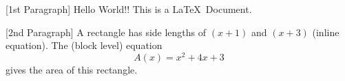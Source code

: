 \documentclass[12pt]{article} %
\begin{document}
[1st Paragraph] Hello World!! This is a \LaTeX\ Document.

\medskip

[2nd Paragraph] A rectangle has side lengths of $(x+1)$ and $(x+3)$ (inline equation).
The (block level) equation $${A(x) = x^2 + 4x + 3}$$ gives the area of this rectangle.
\end{document}
